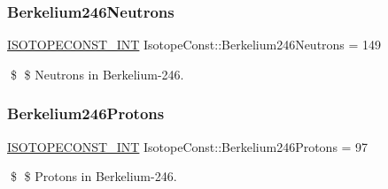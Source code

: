 \subsubsection{\texorpdfstring{Berkelium246\+Neutrons}{Berkelium246Neutrons}}
{\footnotesize\ttfamily \mbox{\hyperlink{group___isotope_const-_macros_ga5f18360b3e99483a35c32d789e62621c}{I\+S\+O\+T\+O\+P\+E\+C\+O\+N\+S\+T\+\_\+\+I\+NT}} Isotope\+Const\+::\+Berkelium246\+Neutrons = 149}

\$ \$ Neutrons in Berkelium-\/246. \mbox{\label{group___isotope_const-_berkelium-_bk246_gab6e96f865e4dc1a854e5a3336700a915}} 
\subsubsection{\texorpdfstring{Berkelium246\+Protons}{Berkelium246Protons}}
{\footnotesize\ttfamily \mbox{\hyperlink{group___isotope_const-_macros_ga5f18360b3e99483a35c32d789e62621c}{I\+S\+O\+T\+O\+P\+E\+C\+O\+N\+S\+T\+\_\+\+I\+NT}} Isotope\+Const\+::\+Berkelium246\+Protons = 97}

\$ \$ Protons in Berkelium-\/246. 